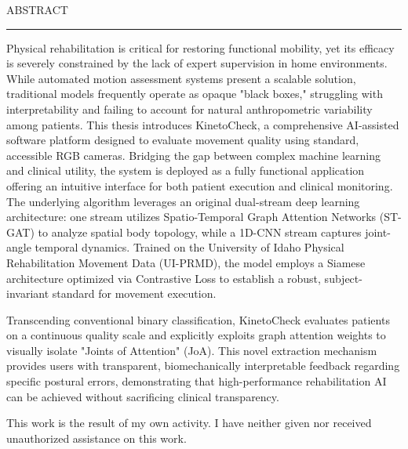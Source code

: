 \documentclass[12pt]{report}
\begin{document}
\thispagestyle{empty}
\mbox{}
\newpage
{} 

\cleardoublepage
ABSTRACT
\vspace{0.5cm}	
\hrule
\vspace{0.5cm}	

Physical rehabilitation is critical for restoring functional mobility, 
yet its efficacy is severely constrained by the lack of expert supervision 
in home environments. While automated motion assessment systems present a
 scalable solution, traditional models frequently operate as opaque "black 
 boxes," struggling with interpretability and failing to account for natural
  anthropometric variability among patients. This thesis introduces KinetoCheck,
   a comprehensive AI-assisted software platform designed to evaluate movement
    quality using standard, accessible RGB cameras. Bridging the gap between 
    complex machine learning and clinical utility, the system is deployed as
     a fully functional application offering an intuitive interface for both 
     patient execution and clinical monitoring. The underlying algorithm 
     leverages an original dual-stream deep learning architecture: one stream 
     utilizes Spatio-Temporal Graph Attention Networks (ST-GAT) to analyze 
     spatial body topology, while a 1D-CNN stream captures joint-angle temporal
      dynamics. Trained on the University of Idaho Physical Rehabilitation
       Movement Data (UI-PRMD)\cite{VJPB18}, the model employs a Siamese architecture 
       optimized via Contrastive Loss to establish a robust, subject-invariant
        standard for movement execution. 
        
        Transcending conventional binary 
        classification, KinetoCheck evaluates patients on a continuous quality
         scale and explicitly exploits graph attention weights to visually
          isolate "Joints of Attention" (JoA). This novel extraction mechanism 
          provides users with transparent, biomechanically interpretable 
          feedback regarding specific postural errors, demonstrating that 
          high-performance rehabilitation AI can be achieved without 
          sacrificing clinical transparency.

This work is the result of my own activity. I have neither given nor received unauthorized assistance on this work.
\tableofcontents


\newpage
{}












\end{document}
